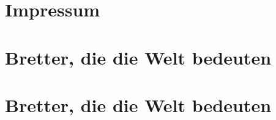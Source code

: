 \documentclass[full]{dtk2}%
\begin{document}
\maketitle

\part{Impressum}


\part{Bretter, die die Welt bedeuten}
\part{Bretter, die die Welt bedeuten}
 \clearpage
{}

\clearpage
\listofaddresses

\tableofcontents
\end{document}

